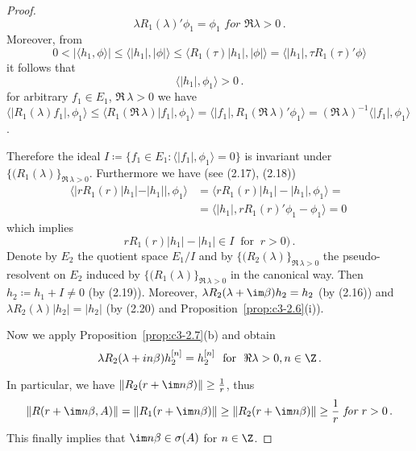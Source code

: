 \begin{proof}
\begin{equation}\label{eq:c3-2.18}
\lambda R_{1}(\lambda)'\phi_{1} = \phi_{1} \textit{ for } \Re\lambda > 0\,.
\end{equation} 
Moreover, from 
\[
0 < |\langle h_{1},\phi \rangle| \leq \langle |h_{1}|,|\phi| \rangle \leq \langle R_{1}(\tau)|h_{1}|,|\phi| \rangle = \langle |h_{1}|,\tau R_{1}(\tau)'\phi \rangle 
\]
it follows that
%
%
%
\begin{equation}\label{eq:c3-2.19}
		\langle |h_{1}|,\phi_{1} \rangle > 0\,.
\end{equation}
for arbitrary $f_{1} \in E_{1}$, $\Re\, \lambda > 0$ we have $\langle |R_{1}(\lambda)f_{1}|,\phi_{1} \rangle \leq \langle R_{1}(\Re\,\lambda)|f_{1}|,\phi_{1} \rangle = \langle |f_{1}|,R_{1}(\Re\,\lambda)'\phi_{1} \rangle = (\Re\,\lambda)^{-1}\langle |f_{1}|,\phi_{1} \rangle$.

Therefore the ideal $I \coloneqq \{f_{1} \in E_{1} : \langle |f_{1}|,\phi_{1} \rangle = 0\}$ is invariant under $\{(R_{1}(\lambda)\}_{\Re\,\lambda>0}$.
Furthermore we have (see (2.17), (2.18)) 
\begin{align*}
	\langle |rR_{1}(r)|h_{1}| - |h_{1}||,\phi_{1} \rangle &= \langle rR_{1}(r)|h_{1}| - |h_{1}|,\phi_{1} \rangle = \\
	& = \langle |h_{1}|,rR_{1}(r)'\phi_{1} - \phi_{1} \rangle = 0\ 
\end{align*}	
which implies
\begin{equation}\label{eq:c3-2.20}
rR_{1}(r)|h_{1}| - |h_{1}| \in I \ \text{ for } \ r > 0)\,.
\end{equation}
Denote by $E_{2}$ the quotient space $E_{1}/I$ and by $\{(R_{2}(\lambda)\}_{\Re\,\lambda>0}$ the pseudo-resolvent on $E_{2}$ induced by $\{(R_{1}(\lambda)\}_{\Re\,\lambda>0}$ in the canonical way. 
Then $h_{2} \coloneqq h_{1} + I \neq 0$ (by (2.19)).
Moreover, $\lambda R_{2}(\lambda+\im\beta)h_{2} = h_{2}$ (by (2.16)) and $\lambda R_{2}(\lambda)|h_{2}| = |h_{2}|$ (by (2.20) and Proposition~\ref{prop:c3-2.6}(i)).

Now we apply Proposition~\ref{prop:c3-2.7}(b) and obtain
\begin{equation}\label{eq:c3-2.21}
	\lambda R_{2}(\lambda+in\beta)h_{2}^{[n]} = h_{2}^{[n]}\ \text{ for } \ \Re\lambda > 0 , n \in \Z\,.
\end{equation}

In particular, we have $\|R_{2}(r+\im n\beta)\| \geq \frac{1}{r}$, thus 
\[
\|R(r+\im n\beta,A)\| = \|R_{1}(r+\im n\beta)\| \geq \|R_{2}(r+\im n\beta)\| \geq \frac{1}{r} \textit{ for } r > 0\,.
\]
This finally implies that $ \im n\beta \in \sigma(A)$ for $n \in \Z$.
\end{proof}

